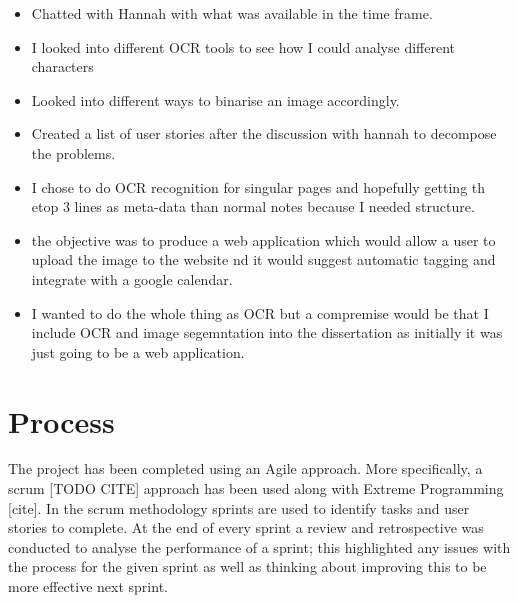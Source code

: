 \begin{itemize}
  \item Chatted with Hannah with what was available in the time frame.
  \item I looked into different OCR tools to see how I could analyse different characters
  \item Looked into different ways to binarise an image accordingly.
  \item Created a list of user stories after the discussion with hannah to decompose the problems.
  \item I chose to do OCR recognition for singular pages and hopefully getting th etop 3 lines as meta-data than normal notes because I needed structure.
  \item the objective was to produce a web application which would allow a user to upload the image to the website nd it would suggest automatic tagging and integrate with a google calendar.
  \item I wanted to do the whole thing as OCR but a compremise would be that I include OCR and image segemntation into the dissertation as initially it was just going to be a web application.
\end{itemize}

\section{Process}
The project has been completed using an Agile approach. More specifically, a scrum [TODO CITE] approach has been used along with Extreme Programming [cite]. In the scrum methodology sprints are used to identify tasks and user stories to complete. At the end of every sprint a review and retrospective was conducted to analyse the performance of a sprint; this highlighted any issues with the process for the given sprint as well as thinking about improving this to be more effective next sprint.

